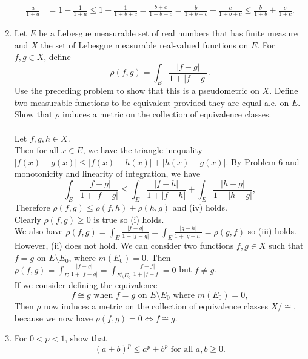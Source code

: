 \begin{enumerate}
    \begin{align*}
        \frac{a}{1+a}&=1-\frac{1}{1+a}\le1-\frac{1}{1+b+c}=\frac{b+c}{1+b+c}=\frac{b}{1+b+c}+\frac{c}{1+b+c}\le\frac{b}{1+b}+\frac{c}{1+c}.
    \end{align*}
    \item Let $E$ be a Lebesgue measurable set of real numbers that has finite measure and $X$ the set of Lebesgue measurable real-valued functions on $E$.
    For $f,g\in X$, define
    \[
    \rho(f,g)=\int_E\frac{|f-g|}{1+|f-g|}.    
    \]
    Use the preceding problem to show that this is a pseudometric on $X$. 
    Define two measurable functions to be equivalent provided they are equal a.e. on $E$.
    Show that $\rho$ induces a metric on the collection of equivalence classes.\\
    \\Let $f,g,h\in X$. 
    \\Then for all $x\in E$, we have the triangle inequality $|f(x)-g(x)|\le|f(x)-h(x)|+|h(x)-g(x)|$.
    By Problem 6 and monotonicity and linearity of integration, we have
    \[
        \int_E\frac{|f-g|}{1+|f-g|}\le\int_E\frac{|f-h|}{1+|f-h|}+\int_E\frac{|h-g|}{1+|h-g|},
    \]
    Therefore $\rho(f,g)\le\rho(f,h)+\rho(h,g)$ and (iv) holds.\\
    Clearly $\rho(f,g)\ge0$ is true so (i) holds.\\
    We also have $\rho(f,g)=\int_E\frac{|f-g|}{1+|f-g|}=\int_E\frac{|g-h|}{1+|g-h|}=\rho(g,f)$ so (iii) holds.\\
    However, (ii) does not hold. We can consider two functions $f,g\in X$ such that $f=g$ on $E\setminus E_0$, where $m(E_0)=0$.
    Then $ \rho(f,g)=\int_E\frac{|f-g|}{1+|f-g|}= \int_{E\setminus E_0}\frac{|f-f|}{1+|f-f|}=0$ but $f\neq g$.\\
    If we consider defining the equivalence 
    \[
        f\cong g\text{ when }f=g \text{ on }E\setminus E_0\text{ where }m(E_0)=0,
    \]
    Then $\rho$ now induces a metric on the collection of equivalence classes $X/\cong$, because we now have $ \rho(f,g)=0\iff f\cong g$.
    \item For $0<p<1$, show that 
    \[
    (a+b)^p\le a^p+b^p\text{ for all }a,b\ge0.    
    \]
    

\end{enumerate}
